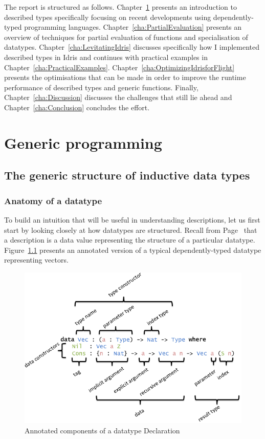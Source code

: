 \documentclass{ituthesis}
\theoremstyle{break}
\begin{document}
The report is structured as follows. Chapter~\ref{cha:GenericProgramming} presents an introduction to described types specifically focusing on recent developments using dependently-typed programming languages.
Chapter~\ref{cha:PartialEvaluation} presents an overview of techniques for partial evaluation of functions and specialisation of datatypes. Chapter~\ref{cha:LevitatingIdris} discusses specifically how I implemented described types in Idris and continues with practical examples in Chapter~\ref{cha:PracticalExamples}.
Chapter~\ref{cha:OptimizingIdrisforFlight} presents the optimisations that can be made in order to improve the runtime performance of described types and generic functions.
Finally, Chapter~\ref{cha:Discussion} discusses the challenges that still lie ahead and Chapter~\ref{cha:Conclusion} concludes the effort.
\chapter{Generic programming}
\label{cha:GenericProgramming}
\section{The generic structure of inductive data types}
\label{sec:TheGenericStructureofInductiveDataTypes}
\subsection{Anatomy of a datatype}
\label{sub:AnatomyofaDatatype}
To build an intuition that will be useful in understanding descriptions, let us first start by looking closely at how datatypes are structured.
Recall from Page~\pageref{kw:desc} that a description is a data value representing the structure of a particular datatype.
Figure~\ref{fig:anatomydatatype} presents an annotated version of a typical dependently-typed datatype representing vectors.

\begin{figure}[ht]
\begin{center}
    \includegraphics[scale=0.5]{Figures/AnatomyOfADatatype.png}
\end{center}
\caption{Annotated components of a datatype Declaration}
\label{fig:anatomydatatype}
\end{figure}
\end{document}
